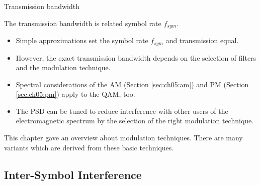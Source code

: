\begin{refsection}
\begin{excursus}{Transmission bandwidth}
	\vspace{1em}
	
	The transmission bandwidth is related symbol rate $f_{sym}$.
	\begin{itemize}
		\item Simple approximations set the symbol rate $f_{sym}$ and transmission equal.
		\item However, the exact transmission bandwidth depends on the selection of filters and the modulation technique.
		\item Spectral considerations of the \ac{AM} (Section \ref{sec:ch05:am}) and \ac{PM} (Section \ref{sec:ch05:pm}) apply to the \ac{QAM}, too.
		\item The \ac{PSD} can be tuned to reduce interference with other users of the electromagnetic spectrum by the selection of the right modulation technique.
	\end{itemize}

	This chapter gave an overview about modulation techniques. There are many variants which are derived from these basic techniques.
\end{excursus}

\subsection{Inter-Symbol Interference}

\begin{figure}[H]
	\centering
\end{figure}
\end{refsection}
